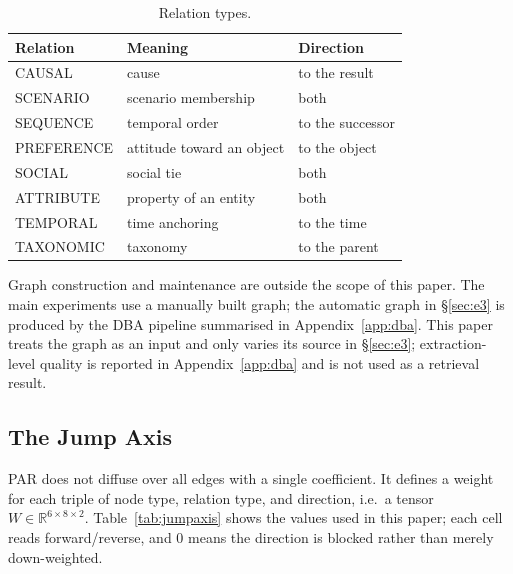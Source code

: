 \documentclass[11pt]{article}
\begin{document}
\begin{table}[t]
  \centering
  \small
  \begin{tabular}{@{}lll@{}}
    \toprule
    Relation & Meaning & Direction \\
    \midrule
    CAUSAL     & cause & to the result \\
    SCENARIO   & scenario membership & both \\
    SEQUENCE   & temporal order & to the successor \\
    PREFERENCE & attitude toward an object & to the object \\
    SOCIAL     & social tie & both \\
    ATTRIBUTE  & property of an entity & both \\
    TEMPORAL   & time anchoring & to the time \\
    TAXONOMIC  & taxonomy & to the parent \\
    \bottomrule
  \end{tabular}
  \caption{Relation types.}\label{tab:reltypes}
\end{table}

Graph construction and maintenance are outside the scope of this paper. The main experiments use a
manually built graph; the automatic graph in \S\ref{sec:e3} is produced by the DBA pipeline
summarised in Appendix~\ref{app:dba}. This paper treats the graph as an input and only varies its
source in \S\ref{sec:e3}; extraction-level quality is reported in Appendix~\ref{app:dba} and
is not used as a retrieval result.

\subsection{The Jump Axis}

PAR does not diffuse over all edges with a single coefficient. It defines a weight for each
triple of node type, relation type, and direction, i.e.\ a tensor
$W\in\mathbb{R}^{6\times 8\times 2}$. Table~\ref{tab:jumpaxis} shows the values used in this
paper; each cell reads forward/reverse, and $0$ means the direction is blocked rather than
merely down-weighted.
\end{document}
